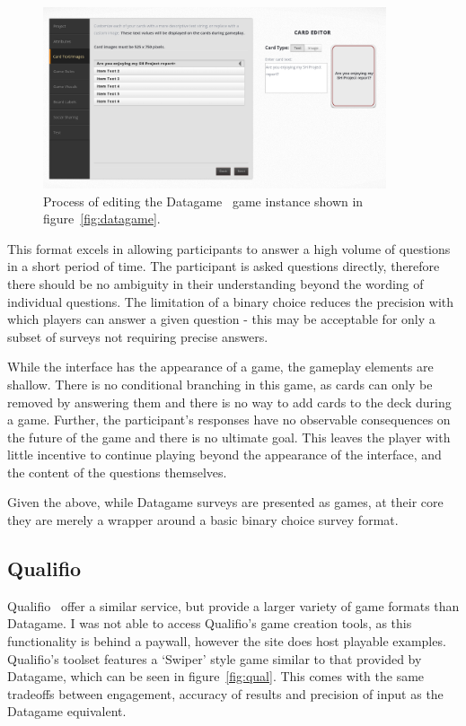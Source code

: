 \begin{figure}[!h]
	\centering
	\includegraphics[width=0.9\textwidth]{./images/context/dg_editor.png}
	\caption{Process of editing the Datagame~\cite{Datagame} game instance shown in figure~\ref{fig:datagame}.}
	\label{fig:dg_editor}
\end{figure}

This format excels in allowing participants to answer a high volume of questions in a short period of time. 
The participant is asked questions directly, therefore there should be no ambiguity in their understanding beyond the wording of individual questions. 
The limitation of a binary choice reduces the precision with which players can answer a given question - this may be acceptable for only a subset of surveys not requiring precise answers.

While the interface has the appearance of a game, the gameplay elements are shallow. 
There is no conditional branching in this game, as cards can only be removed by answering them and there is no way to add cards to the deck during a game. 
Further, the participant's responses have no observable consequences on the future of the game and there is no ultimate goal. This leaves the player with little incentive to continue playing beyond the appearance of the interface, and the content of the questions themselves.

Given the above, while Datagame surveys are presented as games, at their core they are merely a wrapper around a basic binary choice survey format.

\subsection{Qualifio}
Qualifio~\cite{Qualifio} offer a similar service, but provide a larger variety of game formats than Datagame. 
I was not able to access Qualifio's game creation tools, as this functionality is behind a paywall, however the site does host playable examples. 
Qualifio's toolset features a `Swiper' style game similar to  that provided by Datagame, which can be seen in figure~\ref{fig:qual}. This comes with the same tradeoffs between engagement, accuracy of results and precision of input as the Datagame equivalent.

